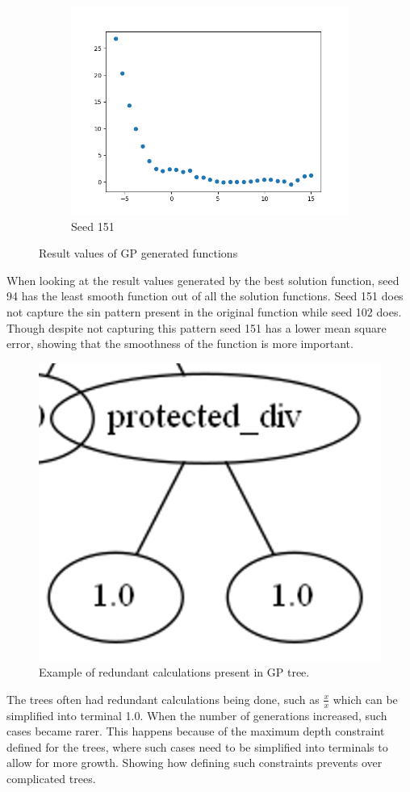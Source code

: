 \documentclass{article}
\begin{document}
\begin{figure}[h!]
\begin{subfigure}[b]{0.3\linewidth}
		\includegraphics[width=\linewidth]{gp_151.png}
		\caption{Seed 151}
	\end{subfigure}
	\caption{Result values of GP generated functions}
\end{figure}
When looking at the result values generated by the best solution function, seed 94 has the least smooth function out of all the solution functions. Seed 151 does not capture the sin pattern present in the original function while seed 102 does. Though despite not capturing this pattern seed 151 has a lower mean square error, showing that the smoothness of the function is more important.  \par
\begin{figure}[h!]
	\centering
	\includegraphics[width=0.5\linewidth]{redundant.png}
	\caption{Example of redundant calculations present in GP tree.}
\end{figure}
The trees often had redundant calculations being done, such as $\frac{x}{x}$ which can be simplified into terminal 1.0. When the number of generations increased, such cases became rarer. This happens because of the maximum depth constraint defined for the trees, where such cases need to be simplified into terminals to allow for more growth. Showing how defining such constraints prevents over complicated trees. \par
\end{document}
